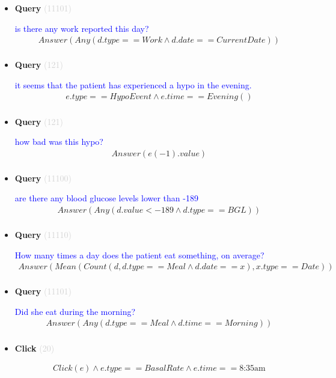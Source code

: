 \documentclass[11pt]{article}
\newcommand{\key}[1]{\textcolor{lightgray}{#1}}
\newcounter{CQuery}
\newcounter{CClick}
\begin{document}
\begin{itemize}
\item
\textbf{Query\theCQuery} \key{(11101)} \addtocounter{CQuery}{1}
\textcolor{blue}{ is there any work reported this day? }
\begin{multline*}
Answer(Any(d.type==Work \wedge d.date==CurrentDate)) \\ 
\end{multline*}


\item
\textbf{Query\theCQuery} \key{(121)} \addtocounter{CQuery}{1}
\textcolor{blue}{ it seems that the patient has experienced a hypo in the evening. }
\begin{multline*}
e.type==HypoEvent \wedge e.time==Evening() \\ 
\end{multline*}


\item
\textbf{Query\theCQuery} \key{(121)} \addtocounter{CQuery}{1}
\textcolor{blue}{ how bad was this hypo? }
\begin{multline*}
Answer(e(-1).value) \\ 
\end{multline*}


\item
\textbf{Query\theCQuery} \key{(11100)} \addtocounter{CQuery}{1}
\textcolor{blue}{ are there any blood glucose levels lower than -189 }
\begin{multline*}
Answer(Any(d.value<-189 \wedge d.type==BGL)) \\ 
\end{multline*}


\item
\textbf{Query\theCQuery} \key{(11110)} \addtocounter{CQuery}{1}
\textcolor{blue}{ How many times a day does the patient eat something, on average? }
\begin{multline*}
Answer(Mean(Count(d, d.type==Meal \wedge d.date==x), x.type==Date)) \\ 
\end{multline*}


\item
\textbf{Query\theCQuery} \key{(11101)} \addtocounter{CQuery}{1}
\textcolor{blue}{ Did she eat during the morning? }
\begin{multline*}
Answer(Any(d.type==Meal \wedge d.time==Morning)) \\ 
\end{multline*}


\item
\textbf{Click\theCClick} \key{(20)} \addtocounter{CClick}{1}
\textcolor{blue}{  }
\begin{multline*}
Click(e) \wedge e.type==BasalRate \wedge e.time==\mbox{8:35am} \\ 
\end{multline*}



\end{itemize}
\end{document}
